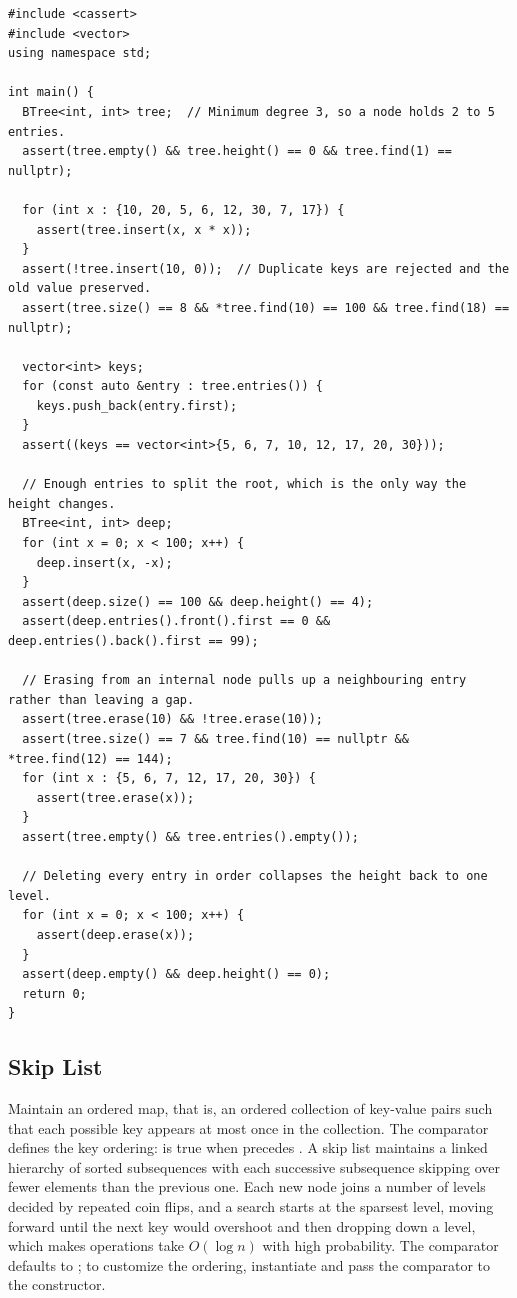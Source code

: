 \begin{lstlisting}[style=cpp]
#include <cassert>
#include <vector>
using namespace std;

int main() {
  BTree<int, int> tree;  // Minimum degree 3, so a node holds 2 to 5 entries.
  assert(tree.empty() && tree.height() == 0 && tree.find(1) == nullptr);

  for (int x : {10, 20, 5, 6, 12, 30, 7, 17}) {
    assert(tree.insert(x, x * x));
  }
  assert(!tree.insert(10, 0));  // Duplicate keys are rejected and the old value preserved.
  assert(tree.size() == 8 && *tree.find(10) == 100 && tree.find(18) == nullptr);

  vector<int> keys;
  for (const auto &entry : tree.entries()) {
    keys.push_back(entry.first);
  }
  assert((keys == vector<int>{5, 6, 7, 10, 12, 17, 20, 30}));

  // Enough entries to split the root, which is the only way the height changes.
  BTree<int, int> deep;
  for (int x = 0; x < 100; x++) {
    deep.insert(x, -x);
  }
  assert(deep.size() == 100 && deep.height() == 4);
  assert(deep.entries().front().first == 0 && deep.entries().back().first == 99);

  // Erasing from an internal node pulls up a neighbouring entry rather than leaving a gap.
  assert(tree.erase(10) && !tree.erase(10));
  assert(tree.size() == 7 && tree.find(10) == nullptr && *tree.find(12) == 144);
  for (int x : {5, 6, 7, 12, 17, 20, 30}) {
    assert(tree.erase(x));
  }
  assert(tree.empty() && tree.entries().empty());

  // Deleting every entry in order collapses the height back to one level.
  for (int x = 0; x < 100; x++) {
    assert(deep.erase(x));
  }
  assert(deep.empty() && deep.height() == 0);
  return 0;
}
\end{lstlisting}
\subsection{Skip List}
\label{sec:2.4.8}
Maintain an ordered map, that is, an ordered collection of key-value pairs such that each possible key appears at most once in the collection. The comparator  defines the key ordering:  is true when  precedes . A skip list maintains a linked hierarchy of sorted subsequences with each successive subsequence skipping over fewer elements than the previous one. Each new node joins a number of levels decided by repeated coin flips, and a search starts at the sparsest level, moving forward until the next key would overshoot and then dropping down a level, which makes operations take $O(\log n)$ with high probability. The comparator defaults to ; to customize the ordering, instantiate  and pass the comparator to the constructor.

